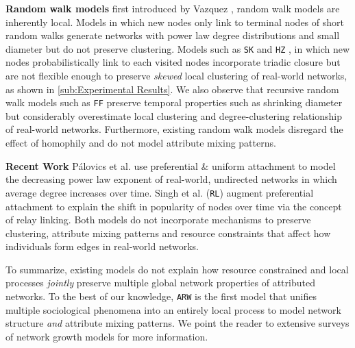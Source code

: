 \textbf{Random walk models}
first introduced by Vazquez \cite{vazquez2000knowing}, random walk models are inherently local.
Models \cite{blum2006random} in which
new nodes only link to terminal nodes of short random walks generate
networks with power law degree distributions \cite{chebolu2008pagerank} and
small diameter \cite{mehrabian2016sa} but do not preserve clustering. Models
such as \texttt{SK} \cite{saramaki2004scale}
and \texttt{HZ} \cite{herrera2011generating}, in which new nodes probabilistically link to
each visited nodes incorporate triadic closure but are not flexible enough to preserve
\textit{skewed} local clustering of real-world networks, as shown in \cref{sub:Experimental Results}.
We also observe that recursive random walk models such as \texttt{FF} \cite{leskovec2005graphs}
preserve temporal properties such as shrinking diameter but considerably overestimate local clustering
and degree-clustering relationship of real-world networks.
Furthermore, existing random walk models disregard the effect of homophily and do not model attribute mixing
patterns.

\textbf{Recent Work}
P{\'a}lovics et al. \cite{palovics2017raising} use preferential \& uniform
attachment to model the decreasing power law exponent of real-world, undirected
networks in which average degree increases over time. Singh et al.
\cite{singh2017relay} (\texttt{RL}) augment preferential attachment to explain
the shift in popularity of nodes over time via the concept of relay linking.
Both models do not incorporate mechanisms to preserve clustering, attribute
mixing patterns and resource constraints that affect how individuals form edges
in real-world networks.

To summarize, existing models do not explain how resource constrained and local processes
\textit{jointly} preserve multiple global network properties of attributed networks.
To the best of our knowledge, \texttt{ARW} is the first model that unifies multiple
sociological phenomena into an entirely local process to model
network structure \textit{and} attribute mixing patterns.
We point the reader to
extensive surveys \cite{newman2003structure,albert2002statistical} of network growth models
for more information.


